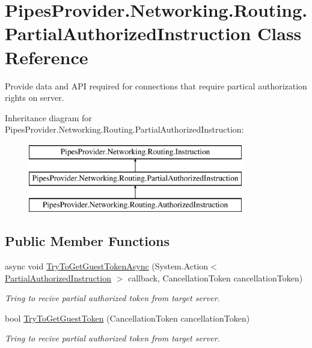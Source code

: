 \hypertarget{class_pipes_provider_1_1_networking_1_1_routing_1_1_partial_authorized_instruction}{}\section{Pipes\+Provider.\+Networking.\+Routing.\+Partial\+Authorized\+Instruction Class Reference}
\label{class_pipes_provider_1_1_networking_1_1_routing_1_1_partial_authorized_instruction}


Provide data and A\+PI required for connections that require partical authorization rights on server.  


Inheritance diagram for Pipes\+Provider.\+Networking.\+Routing.\+Partial\+Authorized\+Instruction\+:\begin{figure}[H]
\begin{center}
\leavevmode
\includegraphics[height=3.000000cm]{dd/df3/class_pipes_provider_1_1_networking_1_1_routing_1_1_partial_authorized_instruction}
\end{center}
\end{figure}
\subsection*{Public Member Functions}
\begin{DoxyCompactItemize}
\item 
async void \mbox{\hyperlink{class_pipes_provider_1_1_networking_1_1_routing_1_1_partial_authorized_instruction_ac84ced39a0d2a20639a82596ef34a093}{Try\+To\+Get\+Guest\+Token\+Async}} (System.\+Action$<$ \mbox{\hyperlink{class_pipes_provider_1_1_networking_1_1_routing_1_1_partial_authorized_instruction}{Partial\+Authorized\+Instruction}} $>$ callback, Cancellation\+Token cancellation\+Token)
\begin{DoxyCompactList}\small\item\em Tring to recive partial authorized token from target server. \end{DoxyCompactList}\item 
bool \mbox{\hyperlink{class_pipes_provider_1_1_networking_1_1_routing_1_1_partial_authorized_instruction_a3ac0a0b15a47f6cfbf26bd0dbabc9b97}{Try\+To\+Get\+Guest\+Token}} (Cancellation\+Token cancellation\+Token)
\begin{DoxyCompactList}\small\item\em Tring to recive partial authorized token from target server. \end{DoxyCompactList}\end{DoxyCompactItemize}
